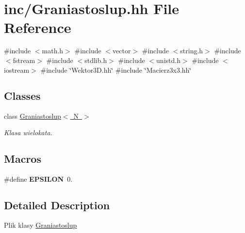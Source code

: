 \hypertarget{_graniastoslup_8hh}{}\section{inc/\+Graniastoslup.hh File Reference}
\label{_graniastoslup_8hh}
{\ttfamily \#include $<$math.\+h$>$}\newline
{\ttfamily \#include $<$vector$>$}\newline
{\ttfamily \#include $<$string.\+h$>$}\newline
{\ttfamily \#include $<$fstream$>$}\newline
{\ttfamily \#include $<$stdlib.\+h$>$}\newline
{\ttfamily \#include $<$unistd.\+h$>$}\newline
{\ttfamily \#include $<$iostream$>$}\newline
{\ttfamily \#include \char`\"{}Wektor3\+D.\+hh\char`\"{}}\newline
{\ttfamily \#include \char`\"{}Macierz3x3.\+hh\char`\"{}}\newline
\subsection*{Classes}
\begin{DoxyCompactItemize}
\item 
class \mbox{\hyperlink{class_graniastoslup}{Graniastoslup$<$ N $>$}}
\begin{DoxyCompactList}\small\item\em Klasa wielokata. \end{DoxyCompactList}\end{DoxyCompactItemize}
\subsection*{Macros}
\begin{DoxyCompactItemize}
\item 
\mbox{\label{_graniastoslup_8hh_a002b2f4894492820fe708b1b7e7c5e70}} 
\#define {\bfseries E\+P\+S\+I\+L\+ON}~0.
\end{DoxyCompactItemize}


\subsection{Detailed Description}
Plik klasy \mbox{\hyperlink{class_graniastoslup}{Graniastoslup}} 